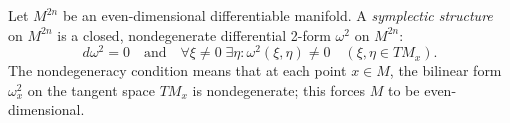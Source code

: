Let $M^{2n}$ be an even-dimensional differentiable manifold. A \textit{symplectic structure} on $M^{2n}$ is a closed, nondegenerate differential 2-form $\omega^2$ on $M^{2n}$:
$$d\omega^2 = 0 \quad \text{and} \quad \forall \xi \neq 0 \; \exists \eta: \omega^2(\xi, \eta) \neq 0 \quad (\xi, \eta \in TM_x).$$
The nondegeneracy condition means that at each point $x \in M$, the bilinear form $\omega^2_x$ on the tangent space $TM_x$ is nondegenerate; this forces $M$ to be even-dimensional.
